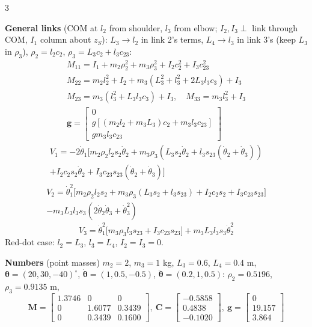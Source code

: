 \begin{multicols}{3}
\begin{examq}
\end{examq}
\begin{examq}
\textbf{General links} (COM at $l_2$ from shoulder, $l_3$ from elbow; $I_2,I_3\perp$ link through COM, $I_1$ column about $z_S$): $L_3\to l_2$ in link 2's terms, $L_4\to l_3$ in link 3's (keep $L_3$ in $\rho_3$), $\rho_2=l_2c_2$, $\rho_3=L_3c_2+l_3c_{23}$:
\begin{gather*}M_{11}=I_1+m_2\rho_2^2+m_3\rho_3^2+I_2c_2^2+I_3c_{23}^2\\ M_{22}=m_2l_2^2+I_2+m_3(L_3^2{+}l_3^2{+}2L_3l_3c_3)+I_3\\
M_{23}=m_3(l_3^2+L_3l_3c_3)+I_3,\quad M_{33}=m_3l_3^2+I_3\\ \mathbf g=\begin{bmatrix}0\\g[(m_2l_2{+}m_3L_3)c_2+m_3l_3c_{23}]\\gm_3l_3c_{23}\end{bmatrix}\end{gather*}
\begin{multline*}V_1=-2\dot\theta_1\big[m_2\rho_2l_2s_2\dot\theta_2+m_3\rho_3(L_3s_2\dot\theta_2+l_3s_{23}(\dot\theta_2{+}\dot\theta_3))\\+I_2c_2s_2\dot\theta_2+I_3c_{23}s_{23}(\dot\theta_2{+}\dot\theta_3)\big]\end{multline*}
\begin{multline*}V_2=\dot\theta_1^2\big[m_2\rho_2l_2s_2+m_3\rho_3(L_3s_2{+}l_3s_{23})+I_2c_2s_2+I_3c_{23}s_{23}\big]\\-m_3L_3l_3s_3(2\dot\theta_2\dot\theta_3{+}\dot\theta_3^2)\end{multline*}
\[V_3=\dot\theta_1^2\big[m_3\rho_3l_3s_{23}+I_3c_{23}s_{23}\big]+m_3L_3l_3s_3\dot\theta_2^2\]
Red-dot case: $l_2=L_3$, $l_3=L_4$, $I_2=I_3=0$.\\
\end{examq}
\begin{examq}[Q4 (e): numbers]
\textbf{Numbers} (point masses) $m_2=2$, $m_3=1$ kg, $L_3=0.6$, $L_4=0.4$ m, $\boldsymbol\theta=(20,30,-40)^\circ$, $\dot{\boldsymbol\theta}=(1,0.5,-0.5)$, $\ddot{\boldsymbol\theta}=(0.2,1,0.5)$: $\rho_2=0.5196$, $\rho_3=0.9135$ m,
\[\mathbf M=\begin{bmatrix}1.3746&0&0\\0&1.6077&0.3439\\0&0.3439&0.1600\end{bmatrix},\ \mathbf C=\begin{bmatrix}-0.5858\\0.4838\\-0.1020\end{bmatrix},\ \mathbf g=\begin{bmatrix}0\\19.157\\3.864\end{bmatrix}\]

\end{examq}
\end{multicols}
